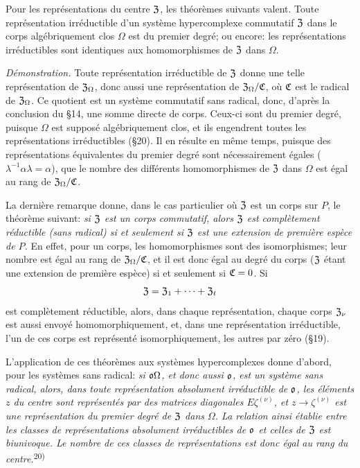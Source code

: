 Pour les représentations du centre $\mathfrak{Z}$, les théorèmes suivants valent. Toute représentation irréductible d'un système hypercomplexe commutatif $\mathfrak{Z}$ dans le corps algébriquement clos $\Omega$ est du premier degré; ou encore: les représentations irréductibles sont identiques aux homomorphismes de $\mathfrak{Z}$ dans $\Omega$.

\emph{Démonstration.} Toute représentation irréductible de $\mathfrak{Z}$ donne une telle représentation de $\mathfrak{Z}_\Omega$, donc aussi une représentation de $\mathfrak{Z}_\Omega/\mathfrak{C}$, où $\mathfrak{C}$ est le radical de $\mathfrak{Z}_\Omega$. Ce quotient est un système commutatif sans radical, donc, d'après la conclusion du \S{}14, une somme directe de corps. Ceux-ci sont du premier degré, puisque $\Omega$ est supposé algébriquement clos, et ils engendrent toutes les représentations irréductibles (\S{}20). Il en résulte en même temps, puisque des représentations équivalentes du premier degré sont nécessairement égales ($\lambda^{-1}\alpha\lambda=\alpha$), que le nombre des différents homomorphismes de $\mathfrak{Z}$ dans $\Omega$ est égal au rang de $\mathfrak{Z}_\Omega/\mathfrak{C}$.

La dernière remarque donne, dans le cas particulier où $\mathfrak{Z}$ est un corps sur $P$, le théorème suivant: \emph{si $\mathfrak{Z}$ est un corps commutatif, alors $\mathfrak{Z}$ est complètement réductible (sans radical) si et seulement si $\mathfrak{Z}$ est une extension de première espèce de $P$.} En effet, pour un corps, les homomorphismes sont des isomorphismes; leur nombre est égal au rang de $\mathfrak{Z}_\Omega/\mathfrak{C}$, et il est donc égal au degré du corps ($\mathfrak{Z}$ étant une extension de première espèce) si et seulement si $\mathfrak{C}=0$. Si
\[
        \mathfrak{Z}=\mathfrak{Z}_1+\cdots+\mathfrak{Z}_t
\]
est complètement réductible, alors, dans chaque représentation, chaque corps $\mathfrak{Z}_\nu$ est aussi envoyé homomorphiquement, et, dans une représentation irréductible, l'un de ces corps est représenté isomorphiquement, les autres par zéro (\S{}19).

L'application de ces théorèmes aux systèmes hypercomplexes donne d'abord, pour les systèmes sans radical: \emph{si $\mathfrak{o}\Omega$, et donc aussi $\mathfrak{o}$, est un système sans radical, alors, dans toute représentation absolument irréductible de $\mathfrak{o}$, les éléments $z$ du centre sont représentés par des matrices diagonales $E\zeta^{(\nu)}$, et $z\to\zeta^{(\nu)}$ est une représentation du premier degré de $\mathfrak{Z}$ dans $\Omega$. La relation ainsi établie entre les classes de représentations absolument irréductibles de $\mathfrak{o}$ et celles de $\mathfrak{Z}$ est biunivoque. Le nombre de ces classes de représentations est donc égal au rang du centre.}\textsuperscript{20)}

